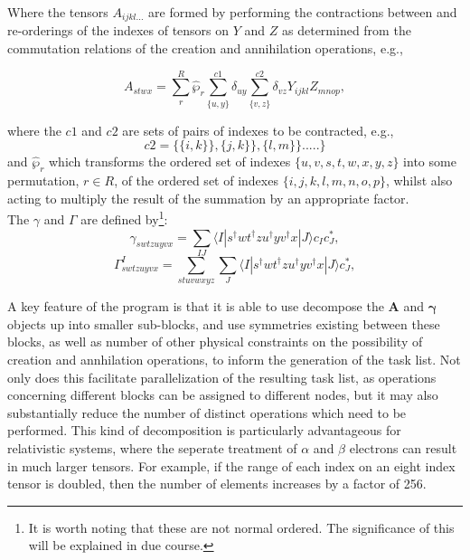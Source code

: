 \noindent Where the tensors $A_{ijkl...}$ are formed by performing the 
contractions between and re-orderings of the indexes of tensors on $Y$ and $Z$ as 
determined from the commutation relations of the creation and annihilation operations, e.g.,
 
\begin{equation*}
A_{stwx} = \sum_{r}^{R}\hat{\wp}_{r}\sum^{c1}_{\{u,y\}}\delta_{uy}\sum^{c2}_{\{v,z\}} \delta_{vz}Y_{ijkl}Z_{mnop},
\end{equation*}

\noindent where the $c1$ and $c2$ are sets of pairs of indexes to be contracted, e.g.,
\begin{equation}
c2 = \{ \{i, k\} \} , \{j, k\} \} ,\{l, m\} \}.....\} 
\end{equation}
and $\hat{\wp}_{r}$ which transforms the ordered set of indexes
$\{u,v,s,t,w,x,y,z\}$ into some permutation, $r\in R$, of the ordered set of
indexes $\{i,j,k,l,m,n,o,p\}$, whilst also acting to multiply the result of the
summation by an appropriate factor.\\

\noindent The $\gamma$ and $\Gamma$ are defined by\footnote{It is worth noting that these are not normal ordered. The significance
of this will be explained in due course.}:
\begin{equation}
\gamma_{swtzuyvx} = \sum_{IJ} \langle I | s^{\dagger}wt^{\dagger}zu^{\dagger}yv^{\dagger}x | J \rangle c_{I} c^{*}_{J},
\end{equation}
\begin{equation}
\Gamma_{swtzuyvx}^{I} = 
\sum_{stuvwxyz} \sum_{J} \langle I | s^{\dagger}wt^{\dagger}zu^{\dagger}yv^{\dagger}x | J \rangle c^{*}_{J},
\end{equation}

\noindent A key feature of the program is that it is able to use decompose the $\mathbf{A}$ and $\mathbf{\gamma}$ objects
up into smaller sub-blocks, and use symmetries existing between these blocks, as well as number of other physical constraints
on the possibility of creation and annhilation operations, to inform the generation of the task list. Not only does this 
facilitate parallelization of the resulting task list, as operations concerning different blocks can be assigned to 
different nodes, but it may also substantially reduce the number of distinct operations which need to be performed. 
This kind of decomposition is particularly advantageous for relativistic systems, where the seperate treatment of
$\alpha$ and $\beta$ electrons can result in much larger tensors. For example, if the range of each index on
an eight index tensor is doubled, then the number of elements increases by a factor of 256.\\ 

